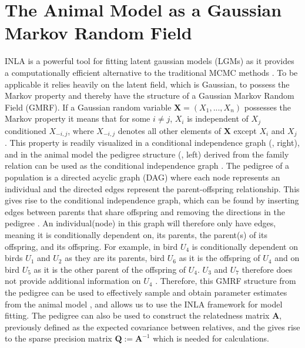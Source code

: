 \section{The Animal Model as a Gaussian Markov Random Field}
\label{sec:animalmodelGMRF}
INLA is a powerful tool for fitting latent gaussian models (LGMs) as it provides a computationally efficient alternative to the traditional MCMC methods \citep{rue2009inla}.
To be applicable it relies heavily on the latent field, which is Gaussian, to possess the Markov property and thereby have the structure of a Gaussian Markov Random Field (GMRF). 
If a Gaussian random variable $\mathbf{X}=(X_1, ..., X_n)$ possesses the Markov property it means that for some $i\neq j$, $X_i$ is independent of $X_j$ conditioned $X_{-i, j}$, where $X_{-i, j}$ denotes all other elements of $\mathbf{X}$ except $X_i$ and $X_j$ \citep{rue2009inla}.
This property is readily visualized in a conditional independence graph (, right), and in the animal model the pedigree structure (, left) derived from the family relation can be used as the conditional independence graph \citep[as cited in \citet{Stensland_GMRF_bayes_animal_model}]{Wermuth1983Graphical}.
The pedigree of a population is a directed acyclic graph (DAG) where each node represents an individual and the directed edges represent the parent-offspring relationship. 
This gives rise to the conditional independence graph, which can be found by inserting edges between parents that share offspring and removing the directions in the pedigree \citep{Wermuth1983Graphical}.
An individual(node) in this graph will therefore only have edges, meaning it is conditionally dependent on, its parents, the parent(s) of its offspring, and its offspring. For example, in  bird $U_4$ is conditionally dependent on birds $U_1$ and $U_2$ as they are its parents, bird $U_6$ as it is the offspring of $U_4$ and on bird $U_5$ as it is the other parent of the offspring of $U_4$. $U_3$ and $U_7$ therefore does not provide additional information on $U_4$ \citep{Stensland_GMRF_bayes_animal_model}. Therefore, this GMRF structure from the pedigree can be used to effectively sample and obtain parameter estimates from the animal model \citep{Stensland_GMRF_bayes_animal_model}, and allows us to use the INLA framework for model fitting.
The pedigree can also be used to construct the relatedness matrix $\mathbf{A}$, previously defined as the expected covariance between relatives, and the gives rise to the sparse precision matrix $\mathbf{Q}:=\mathbf{A}^{-1}$ which is needed for calculations.
